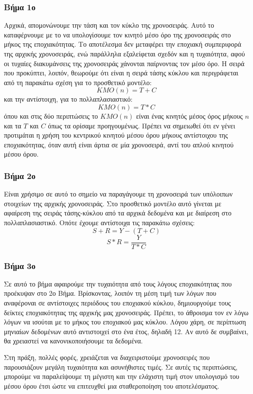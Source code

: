 \subsubsection{Βήμα 1ο}
Αρχικά, απομονώνουμε την τάση και τον κύκλο της χρονοσειράς. Αυτό το καταφέρνουμε με το να υπολογίσουμε τον κινητό μέσο όρο της χρονοσειράς στο μήκος της εποχιακότητας. Το αποτέλεσμα δεν μεταφέρει την εποχιακή συμπεριφορά της αρχικής χρονοσειράς, ενώ παράλληλα εξαλείφεται σχεδόν και η τυχαιότητα, αφού οι τυχαίες διακυμάνσεις της χρονοσειράς χάνονται παίρνοντας τον μέσο όρο. Η σειρά που προκύπτει, λοιπόν, θεωρούμε ότι είναι η σειρά τάσης κύκλου και περιγράφεται από τη παρακάτω σχέση για το προσθετικό μοντέλο:
\[ KMO(n)= T + C \]
και την αντίστοιχη, για το πολλαπλασιαστικό:
\[ KMO(n)= T * C \]
όπου και στις δύο περιπτώσεις το $KMO(n)$ είναι ένας κινητός μέσος όρος μήκους $n$ και τα $T$ και $C$ όπως τα ορίσαμε προηγουμένως. Πρέπει να σημειωθεί ότι εν γένει προτιμάται η χρήση του κεντρικού κινητού μέσου όρου μήκους αντίστοιχου της εποχιακότητας, όταν αυτή είναι άρτια σε μία χρονοσειρά, αντί του απλού κινητού μέσου όρου. 

\subsubsection{Βήμα 2ο}
Είναι χρήσιμο σε αυτό το σημείο να παραγάγουμε τη χρονοσειρά των υπόλοιπων στοιχείων της αρχικής χρονοσειράς. Στο προσθετικό μοντέλο αυτό γίνεται με αφαίρεση της σειράς τάσης-κύκλου από τα αρχικά δεδομένα και με διαίρεση στο πολλαπλασιαστικό. Οπότε έχουμε αντίστοιχα τις παρακάτω σχέσεις:
\[ S+R = Y-(T+C)\]
\[ S*R = \frac{Y}{T*C}\]

\subsubsection{Βήμα 3ο}
Σε αυτό το βήμα αφαιρούμε την τυχαιότητα από τους λόγους εποχιακότητας που προέκυψαν στο 2ο Βήμα. Βρίσκοντας, λοιπόν τη μέση τιμή των λόγων που αναφέροναι σε αντίστοιχες περιόδους του εποχιακού κύκλου, δημιουργούμε τους δείκτες εποχιακότητας της αρχικής μας χρονοσειράς. Πρέπει, το άθροισμα τον εν λόγω λόγων να ισούται με το μήκος του εποχιακού μας κύκλου. Λόγου χάρη, σε περίπτωση μηνιαίων δεδομένων αυτό αντιστοιχεί στο ένα έτος, δηλαδή 12.
Αν αυτό δε συμβαίνει, θα χρειαστεί να κανονικοποιήσουμε τα δεδομένα.

Στη πράξη, πολλές φορές, χρειάζεται να διαχειριστούμε χρονοσειρές που παρουσιάζουν μεγάλη τυχαιότητα και ασυνήθιστες τιμές. Σε αυτές τις περιπτώσεις, μπορούμε να παραλείψουμε τη μέγιστη και την ελάχιστη τιμή στον υπολογισμό του μέσου όρου έτσι ώστε να επιτευχθεί μια σταθεροποίηση του αποτελέσματος.

